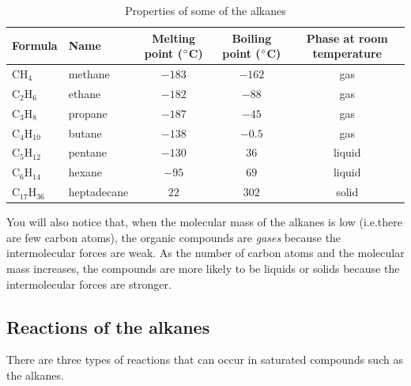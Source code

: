 \begin{table}[h]
\begin{center}
\begin{tabular}{|l|l|c|c|c|}\hline
\textbf{Formula} & \textbf{Name} & \textbf{Melting point ($^{\circ}$C)} & \textbf{Boiling point ($^{\circ}$C)} & \textbf{Phase at room temperature}\\\hline
CH$_{4}$ & methane & $-183$ & $-162$ & gas\\\hline
C$_{2}$H$_{6}$ & ethane & $-182$ & $-88$  & gas\\\hline
C$_{3}$H$_{8}$ & propane & $-187$ & $-45$ & gas \\\hline
C$_{4}$H$_{10}$ & butane & $-138$ & $-0.5$ & gas \\\hline
C$_{5}$H$_{12}$ & pentane & $-130$ & $36$ & liquid \\\hline
C$_{6}$H$_{14}$ & hexane & $-95$ & $69$ & liquid \\\hline
C$_{17}$H$_{36}$ & heptadecane & $22$ & $302$ & solid \\\hline
\end{tabular}
\caption{Properties of some of the alkanes}
\label{fig:alkane properties}
\end{center}
\end{table}

You will also notice that, when the molecular mass of the alkanes is low (i.e.\@ there are few carbon atoms), the organic compounds are \textit{gases} because the intermolecular forces are weak. As the number of carbon atoms and the molecular mass increases, the compounds are more likely to be liquids or solids because the intermolecular forces are stronger.

\subsection{Reactions of the alkanes}

There are three types of reactions that can occur in saturated compounds such as the alkanes.

